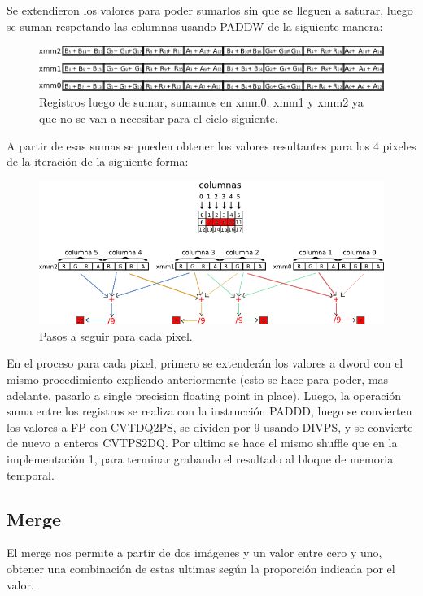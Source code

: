 \documentclass[a4paper]{article}
\begin{document}
Se extendieron los valores para poder sumarlos sin que se lleguen a saturar, luego se suman respetando las columnas usando PADDW de la siguiente manera:

\begin{figure}[H]
\centering
\includegraphics[scale=0.8]{imagenes/blur2add.png}
\caption{Registros luego de sumar, sumamos en xmm0, xmm1 y xmm2 ya que no se van a necesitar para el ciclo siguiente.}
\label{b2unpack}
\end{figure}

A partir de esas sumas se pueden obtener los valores resultantes para los 4 pixeles de la iteración de la siguiente forma:

\begin{figure}[H]
\centering
\includegraphics[scale=0.8]{imagenes/blur2end.png}
\caption{Pasos a seguir para cada pixel.}
\label{b2endprocess}
\end{figure}

En el proceso para cada pixel, primero se extenderán los valores a dword con el mismo procedimiento explicado anteriormente (esto se hace para poder, mas adelante, pasarlo a single precision floating point in place). Luego, la operación suma entre los registros se realiza con la instrucción PADDD, luego se convierten los valores a FP con CVTDQ2PS, se dividen por 9 usando DIVPS, y se convierte de nuevo a enteros CVTPS2DQ. Por ultimo se hace el mismo shuffle que en la implementación 1, para terminar grabando el resultado al bloque de memoria temporal.


\subsection{Merge}

El merge nos permite a partir de dos imágenes y un valor entre cero y uno, obtener una combinación de estas ultimas según la proporción indicada por el valor.
\end{document}
